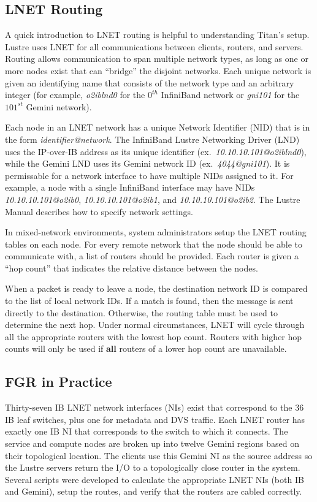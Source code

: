 \subsection{LNET Routing}

A quick introduction to LNET routing is helpful to understanding Titan's setup.
Lustre uses LNET for all communications between clients, routers, and servers.
Routing allows communication to span multiple network types, as long as one or
more nodes exist that can ``bridge'' the disjoint networks.  Each unique
network is given an identifying name that consists of the network type and an
arbitrary integer (for example, \textit{o2iblnd0} for the $0^{th}$ InfiniBand
network or \textit{gni101} for the $101^{st}$ Gemini network).

Each node in an LNET network has a unique Network Identifier (NID) that is in
the form \textit{identifier@network}.  The InfiniBand Lustre Networking Driver
(LND) uses the IP-over-IB address as its unique identifier
(ex.~\textit{10.10.10.101@o2iblnd0}), while the Gemini LND uses its Gemini
network ID (ex.~\textit{4044@gni101}).  It is permissable for a network
interface to have multiple NIDs assigned to it.  For example, a node with a
single InfiniBand interface may have NIDs \textit{10.10.10.101@o2ib0},
\textit{10.10.10.101@o2ib1}, and \textit{10.10.10.101@o2ib2}.  The Lustre
Manual \cite{lustre-manual} describes how to specify network settings.

In mixed-network environments, system administrators setup the LNET routing
tables on each node.  For every remote network that the node should be able to
communicate with, a list of routers should be provided.  Each router is given a
``hop count'' that indicates the relative distance between the nodes.

When a packet is ready to leave a node, the destination network ID is compared
to the list of local network IDs.  If a match is found, then the message is
sent directly to the destination.  Otherwise, the routing table must be used to
determine the next hop.  Under normal circumstances, LNET will cycle through
all the appropriate routers with the lowest hop count.  Routers with higher hop
counts will only be used if \textbf{all} routers of a lower hop count are
unavailable.

\subsection{FGR in Practice}

Thirty-seven IB LNET network interfaces (NIs) exist that correspond to the 36
IB leaf switches, plus one for metadata and DVS traffic. Each LNET router has
exactly one IB NI that corresponds to the switch to which it connects. The
service and compute nodes are broken up into twelve Gemini regions based on
their topological location. The clients use this Gemini NI as the source
address so the Lustre servers return the I/O to a topologically close router in
the system. Several scripts were developed to calculate the appropriate LNET
NIs (both IB and Gemini), setup the routes, and verify that the routers are
cabled correctly.



